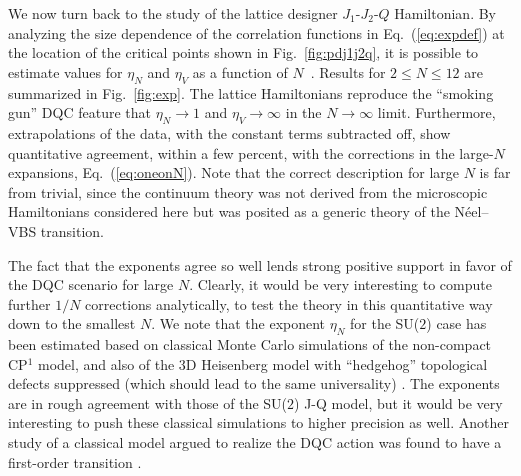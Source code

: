 \documentclass[10pt,pre,aps,twocolumn,showpacs,superscriptaddress,floatfix]{revtex4-1}
\begin{document}
We now turn back to the study of the lattice designer $J_1$-$J_2$-$Q$ Hamiltonian. By analyzing the size dependence of the correlation 
functions in Eq.~(\ref{eq:expdef}) at the location of the critical points shown in Fig.~\ref{fig:pdj1j2q}, it is possible to
estimate values for $\eta_N$ and $\eta_V$ as a function of $N$~\cite{lou2009:sun,kaul2011:j1j2}. Results for $2\leq N \leq 12$ are 
summarized in Fig.~\ref{fig:exp}. The lattice Hamiltonians reproduce the ``smoking gun'' DQC feature that $\eta_N \to 1$ and $\eta_V \to \infty$ in 
the $N\rightarrow \infty$ limit. Furthermore, extrapolations of the data, with the constant terms subtracted off, show quantitative 
agreement, within a few percent, with the corrections in the large-$N$ expansions, Eq.~(\ref{eq:oneonN}). Note that the correct description for large 
$N$ is far from trivial, since the continuum theory was not derived from the microscopic Hamiltonians considered here but was posited as a 
generic theory of the N\'eel--VBS transition. 

The fact that the exponents agree so well lends strong positive support in favor of the DQC scenario for large $N$. Clearly, it would be 
very interesting to compute further $1/N$ corrections analytically, to test the theory in this quantitative way down to the smallest $N$. We note 
that the exponent $\eta_N$ for the SU($2$) case has been estimated based on classical Monte Carlo simulations of the non-compact CP$^1$ model, and
also of the 3D Heisenberg model with ``hedgehog'' topological defects suppressed (which should lead to the same universality) \cite{Motrunich04}. 
The exponents are in rough agreement with those of the SU($2$) J-Q model, but it would be very interesting to push these classical simulations to 
higher precision as well. Another study of a classical model argued to realize the DQC action was found to have a first-order 
transition \cite{Kuklov08}.
\end{document}
